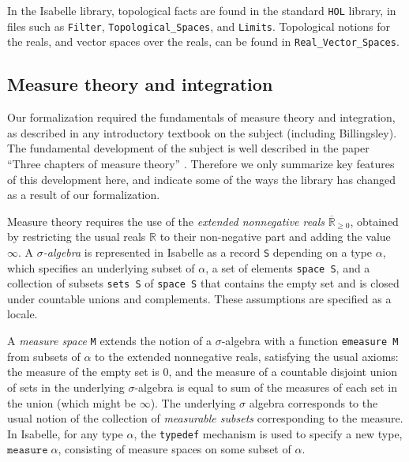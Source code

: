 \documentclass{svjour3}
\newcommand{\RR}{\mathbb{R}}
\newcommand{\ennRR}{\overline{\mathbb{R}}_{\ge 0}}
\begin{document}
In the Isabelle library, topological facts are found in the standard \texttt{HOL} library, in files such as \texttt{Filter}, \texttt{Topological\_Spaces}, and \texttt{Limits}. Topological notions for the reals, and vector spaces over the reals, can be found in \texttt{Real\_Vector\_Spaces}.


\subsection{Measure theory and integration}
\label{subsection:measure:theory}

Our formalization required the fundamentals of measure theory and integration, as described in any introductory textbook on the subject (including Billingsley). The fundamental development of the subject is well described in the paper ``Three chapters of measure theory'' \cite{hoelzl:heller:11}. Therefore we only summarize key features of this development here, and indicate some of the ways the library has changed as a result of our formalization.

Measure theory requires the use of the \emph{extended nonnegative reals} $\ennRR$, obtained by restricting the usual reals $\RR$ to their non-negative part and adding the value $\infty$. A \emph{$\sigma$-algebra} is represented in Isabelle as a record \texttt{S} depending on a type $\alpha$, which specifies an underlying subset of $\alpha$, a set of elements \texttt{space S}, and a collection of subsets \texttt{sets S} of \texttt{space S} that contains the empty set and is closed under countable unions and complements. These assumptions are specified as a locale.

A \emph{measure space} \texttt{M} extends the notion of a $\sigma$-algebra with a function \texttt{emeasure M} from subsets of $\alpha$ to the extended nonnegative reals, satisfying the usual axioms: the measure of the empty set is $0$, and the measure of a countable disjoint union of sets in the underlying $\sigma$-algebra is equal to sum of the measures of each set in the union (which might be $\infty$). The underlying $\sigma$ algebra corresponds to the usual notion of the collection of \emph{measurable subsets} corresponding to the measure. In Isabelle, for any type $\alpha$, the \texttt{typedef} mechanism is used to specify a new type, $\mathtt{measure} \; \alpha$, consisting of measure spaces on some subset of $\alpha$.
\end{document}
